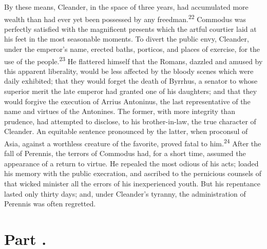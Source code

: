 By these means, Cleander, in the space of three years, had
accumulated more wealth than had ever yet been possessed by any
freedman.\textsuperscript{22} Commodus was perfectly satisfied with the
magnificent presents which the artful courtier laid at his feet
in the most seasonable moments. To divert the public envy,
Cleander, under the emperor’s name, erected baths, porticos, and
places of exercise, for the use of the people.\textsuperscript{23} He flattered
himself that the Romans, dazzled and amused by this apparent
liberality, would be less affected by the bloody scenes which
were daily exhibited; that they would forget the death of
Byrrhus, a senator to whose superior merit the late emperor had
granted one of his daughters; and that they would forgive the
execution of Arrius Antoninus, the last representative of the
name and virtues of the Antonines. The former, with more
integrity than prudence, had attempted to disclose, to his
brother-in-law, the true character of Cleander. An equitable
sentence pronounced by the latter, when proconsul of Asia,
against a worthless creature of the favorite, proved fatal to
him.\textsuperscript{24} After the fall of Perennis, the terrors of Commodus had,
for a short time, assumed the appearance of a return to virtue.
He repealed the most odious of his acts; loaded his memory with
the public execration, and ascribed to the pernicious counsels of
that wicked minister all the errors of his inexperienced youth.
But his repentance lasted only thirty days; and, under Cleander’s
tyranny, the administration of Perennis was often regretted.




\section{Part \thesection.}


